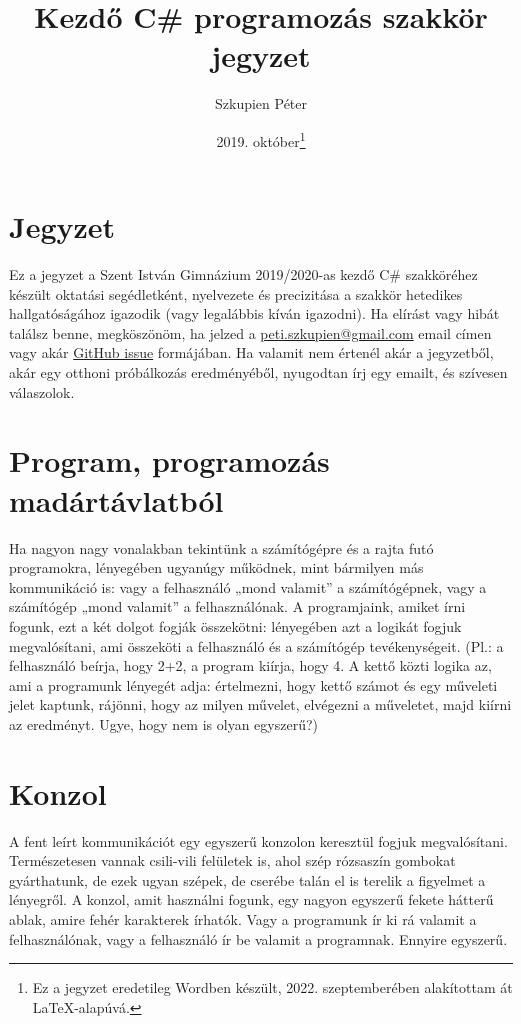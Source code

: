 \documentclass[a4paper]{article}
\title{Kezdő C\# programozás szakkör jegyzet}
\author{Szkupien Péter}
\date{2019. október\footnote{Ez a jegyzet eredetileg Wordben készült, 2022. szeptemberében alakítottam át \LaTeX-alapúvá.}}
\begin{document}
\maketitle

\tableofcontents

\section{Jegyzet}
Ez a jegyzet a Szent István Gimnázium 2019/2020-as kezdő C\# szakköréhez készült oktatási segédletként, nyelvezete és precizitása a szakkör hetedikes hallgatóságához igazodik (vagy legalábbis kíván igazodni). Ha elírást vagy hibát találsz benne, megköszönöm, ha jelzed a \href{mailto:peti.szkupien@gmail.com}{peti.szkupien@gmail.com} email címen vagy akár \href{https://github.com/szkupienpeti/csharp-lecture-notes/issues}{GitHub issue} formájában. Ha valamit nem értenél akár a jegyzetből, akár egy otthoni próbálkozás eredményéből, nyugodtan írj egy emailt, és szívesen válaszolok.

\section{Program, programozás madártávlatból}
Ha nagyon nagy vonalakban tekintünk a számítógépre és a rajta futó programokra, lényegében ugyanúgy működnek, mint bármilyen más kommunikáció is: vagy a felhasználó „mond valamit” a számítógépnek, vagy a számítógép „mond valamit” a felhasználónak. A programjaink, amiket írni fogunk, ezt a két dolgot fogják összekötni: lényegében azt a logikát fogjuk megvalósítani, ami összeköti a felhasználó és a számítógép tevékenységeit. (Pl.: a felhasználó beírja, hogy 2+2, a program kiírja, hogy 4. A kettő közti logika az, ami a programunk lényegét adja: értelmezni, hogy kettő számot és egy műveleti jelet kaptunk, rájönni, hogy az milyen művelet, elvégezni a műveletet, majd kiírni az eredményt. Ugye, hogy nem is olyan egyszerű?)

\section{Konzol}
A fent leírt kommunikációt egy egyszerű konzolon keresztül fogjuk megvalósítani. Természetesen vannak csili-vili felületek is, ahol szép rózsaszín gombokat gyárthatunk, de ezek ugyan szépek, de cserébe talán el is terelik a figyelmet a lényegről. A konzol, amit használni fogunk, egy nagyon egyszerű fekete hátterű ablak, amire fehér karakterek írhatók. Vagy a programunk ír ki rá valamit a felhasználónak, vagy a felhasználó ír be valamit a programnak. Ennyire egyszerű.
\end{document}
